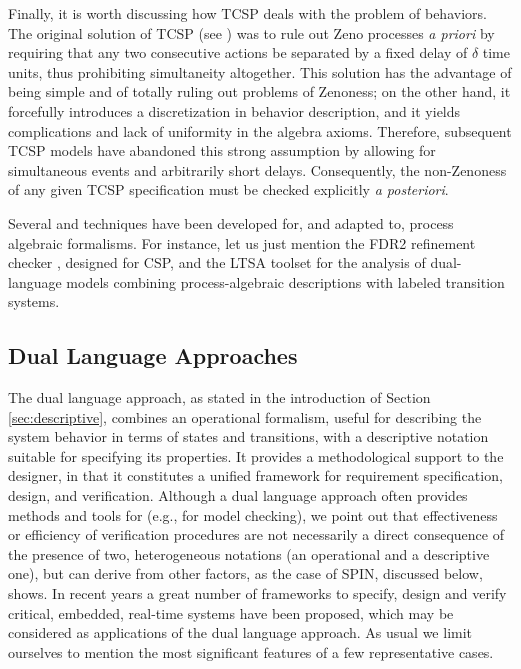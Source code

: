 Finally, it is worth discussing how TCSP deals with the problem 
of  behaviors. The original solution of TCSP (see \cite{DS95}) 
was to rule out Zeno processes \emph{a priori} by requiring that 
any two consecutive actions be separated by a fixed delay of $\delta$
time units, thus prohibiting simultaneity altogether. This solution 
has the advantage of being simple and of totally ruling out problems 
of Zenoness; on the other hand, it forcefully introduces a discretization 
in behavior description, and it yields complications and lack of uniformity 
in the algebra axioms. Therefore, subsequent TCSP models have 
abandoned this strong assumption by allowing for simultaneous 
events and arbitrarily short delays. Consequently, the non-Zenoness 
of any given TCSP specification must be checked explicitly \emph{a posteriori}.

Several  and  techniques have been developed 
for, and adapted to, process algebraic formalisms. For instance, 
let us just mention the FDR2 refinement checker \cite{Ros97}, designed 
for CSP, and the LTSA toolset \cite{MK99} for the analysis of dual-language 
models combining process-algebraic descriptions with labeled 
transition systems.



\subsection{Dual Language Approaches} \label{sec:duallanguage}
The dual language approach, as stated in the introduction 
of Section \ref{sec:descriptive}, combines an operational formalism, useful for 
describing the system behavior in terms of states and transitions, 
with a descriptive notation suitable for specifying its properties. 
It provides a methodological support to the designer, in that 
it constitutes a unified framework for requirement specification, 
design, and verification. Although a dual language approach often 
provides methods and tools for  (e.g., for model 
checking), we point out that effectiveness or efficiency of verification 
procedures are not necessarily a direct consequence of the presence 
of two, heterogeneous notations (an operational and a descriptive 
one), but can derive from other factors, as the case of SPIN, 
discussed below, shows. In recent years a great number of frameworks 
to specify, design and verify critical, embedded, real-time systems 
have been proposed, which may be considered as applications of 
the dual language approach. As usual we limit ourselves to mention 
the most significant features of a few representative cases.


